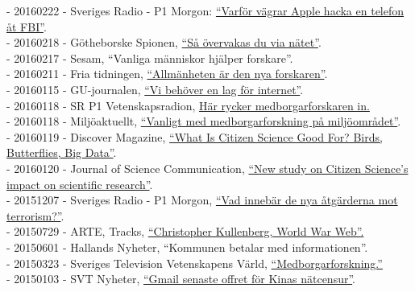 \documentclass[a4paper,11pt,oneside]{article}
\begin{document}
{    - 20160222 - Sveriges Radio - P1 Morgon: \href{http://t.sr.se/1KBHSak}{``Varför vägrar Apple hacka en telefon åt FBI''}. \\
    - 20160218 - Götheborske Spionen, \href{http://www.spionen.se/140-redaktionellt/reportage/feature/1593-sa-oevervakas-du-via-naetet}{``Så övervakas du via nätet''}. \\
    - 20160217 - Sesam, ``Vanliga människor hjälper forskare''.\\
    - 20160211 - Fria tidningen, \href{http://www.fria.nu/artikel/121724}{``Allmänheten är den nya forskaren''}. \\
    - 20160115 - GU-journalen, \href{https://issuu.com/universityofgothenburg/docs/guj1-2016/32}{``Vi behöver en lag för internet''}. \\
    - 20160118 - SR P1 Vetenskapsradion, \href{http://t.sr.se/239vggG}{Här rycker medborgarforskaren in.}\\
    - 20160118 - Miljöaktuellt, \href{http://miljoaktuellt.se/vanligare-att-forskare-tar-hjalp-av-allmanheten/}{``Vanligt med medborgarforskning på miljöområdet''}. \\
    - 20160119 - Discover Magazine, \href{http://blogs.discovermagazine.com/inkfish/2016/01/19/what-is-citizen-science-good-for-birds-butterflies-big-data/#.Vp9DvPGFB24}{``What Is Citizen Science Good For? Birds, Butterflies, Big Data''}. \\
    - 20160120 - Journal of Science Communication, \href{http://jcom.sissa.it/node/3076}{``New study on Citizen Science’s impact on scientific research''}. \\
    - 20151207 - Sveriges Radio - P1 Morgon, \href{http://t.sr.se/1XMYemi}{``Vad innebär de nya åtgärderna mot terrorism?''}. \\
    - 20150729 - ARTE, Tracks, \href{http://tracks.arte.tv/fr/christopher-kullenberg-world-war-web}{``Christopher Kullenberg, World War Web''.} \\
    - 20150601 - Hallands Nyheter, ``Kommunen betalar med informationen''.\\
    - 20150323 - Sveriges Television Vetenskapens Värld, \href{https://youtu.be/vG8sZQnU7mU?t=18m1s}{``Medborgarforskning.''} \\
    - 20150103 - SVT Nyheter, \href{http://www.svt.se/nyheter/utrikes/gmail-senaste-malet-for-kinas-natcensur?cmpid=del:pd:ny:20160803:gmail-senaste-malet-for-kinas-natcensur:nyh}{``Gmail senaste offret för Kinas nätcensur''}. \\
}
\end{document}
